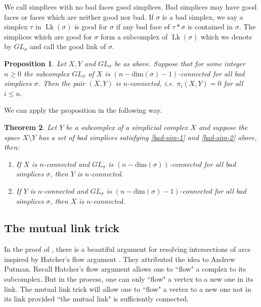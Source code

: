 \documentclass[11pt, a4paper]{amsart}
\newtheorem{thm}{Theorem}[section]
\newtheorem{prop}[thm]{Proposition}
\theoremstyle{definition}
\DeclareMathOperator{\Lk}{Lk}
\begin{document}
We call simplices with no bad faces good simplices. Bad simplices may have good faces or faces which are neither good nor bad. If $\sigma$ is a bad simplex, we say a simplex $\tau$ in $\Lk (\sigma)$ is good for $\sigma$ if any bad face of $\tau\ast \sigma$ is contained in $\sigma$. The simplices which are good for $\sigma$ form a subcomplex of $\Lk(\sigma)$ which we denote by $GL_{\sigma}$ and call the good link of $\sigma$.

\begin{prop} \cite[Proposition 2.1]{HV17}\label{prop-bad-sim}
Let $X, Y$ and $GL_\sigma$ be as above. Suppose that for some integer $n\geq 0$ the subcomplex $GL_\sigma$ of $X$ is $(n-\text{dim}(\sigma)-1)$-connected for all bad simplices $\sigma$. Then the pair $(X,Y)$ is $n$-connected, i.e. $\pi_i(X,Y) = 0$ for all $i\leq n$. 
\end{prop}

We can apply the proposition in the following way.

\begin{thm} \cite[Corollary 2.2]{HV17}\label{thm--bad-sim}
Let $Y$ be a subcomplex of a simplicial complex $X$ and suppose the space $X\setminus Y$ has a set of bad simplices satisfying \ref{bad-sim-1} and \ref{bad-sim-2} above, then:
\begin{enumerate}  [label=(\arabic*)]
    \item If $X$ is $n$-connected and $GL_\sigma$ is $(n-\text{dim}(\sigma))$-connected for all bad simplices $\sigma$, then $Y$ is $n$-connected.
    
    \item  If $Y$ is $n$-connected and $GL_\sigma$ is $(n-\text{dim}(\sigma)-1)$-connected for all bad simplices $\sigma$, then $X$ is $n$-connected. 
    
\end{enumerate}
\end{thm}


\subsection{The mutual link trick}
In the proof of \cite[Theorem 3.10]{BFM+16}, there is a beautiful argument for resolving intersections of arcs inspired by Hatcher's flow argument \cite{Hat91}. They attributed the idea to Andrew Putman. Recall Hatcher's flow argument allows one to ``flow" a complex to its subcomplex. But in the process, one can only ``flow" a vertex to a new one in its link. The mutual link trick will allow one to ``flow" a vertex to a new one not in its link provided ``the mutual link" is sufficiently connected.
\end{document}
